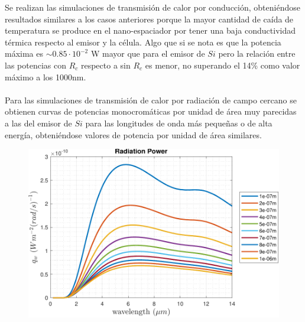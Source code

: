 Se realizan las simulaciones de transmisión de calor por conducción, obteniéndose resultados similares a los casos anteriores porque la mayor cantidad de caída de temperatura se produce en el nano-espaciador por tener una baja conductividad térmica respecto al emisor y la célula. Algo que si se nota es que la potencia máxima es $\sim 0.85\cdot 10^{-2}$ W mayor que para el emisor de $Si$ pero la relación entre las potencias con $R_c$ respecto a sin $R_c$ es menor, no superando el 14\% como valor máximo a los 1000nm.\\\\
Para las simulaciones de transmisión de calor por radiación de campo cercano se obtienen curvas de potencias monocromáticas por unidad de área muy parecidas a las del emisor de $Si$ para las longitudes de onda más pequeñas o de alta energía, obteniéndose valores de potencia por unidad de área similares.
\begin{figure}[h]
	\centering
		\includegraphics[width=1.00\textwidth]{figuras/Resultados/radiacion/SiCGe.pdf}
	\caption{ }
	\label{fig:rad_SiCGe}
\end{figure}


